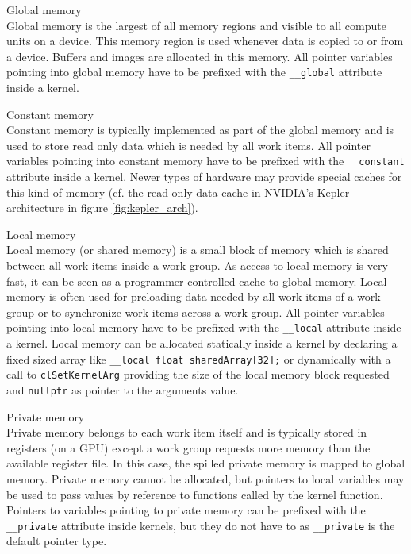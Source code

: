 \begin{numbereddescription}
	\item[Global memory] \hfill \\
	Global memory is the largest of all memory regions and visible to all compute units on a device. This memory region is used whenever data is copied to or from a device. Buffers and images are allocated in this memory. All pointer variables pointing into global memory have to be prefixed with the \lstinline!__global! attribute inside a kernel. \cite[p.29]{opencl_book}
	
	\item[Constant memory] \hfill \\
	Constant memory is typically implemented as part of the global memory and is used to store read only data which is needed by all work items. All pointer variables pointing into constant memory have to be prefixed with the \lstinline!__constant! attribute inside a kernel. \cite[p.30]{opencl_book} Newer types of hardware may provide special caches for this kind of memory (cf. the read-only data cache in NVIDIA's Kepler architecture in figure \ref{fig:kepler_arch}).
	
	\item[Local memory] \hfill \\
	Local memory (or shared memory) is a small block of memory which is shared between all work items inside a work group. As access to local memory is very fast, it can be seen as a programmer controlled cache to global memory. Local memory is often used for preloading data needed by all work items of a work group or to synchronize work items across a work group. All pointer variables pointing into local memory have to be prefixed with the \lstinline!__local! attribute inside a kernel. Local memory can be allocated statically inside a kernel by declaring a fixed sized array like \lstinline!__local float sharedArray[32];! or dynamically with a call to \lstinline!clSetKernelArg! providing the size of the local memory block requested and \lstinline!nullptr! as pointer to the arguments value. \cite[p.30]{opencl_book}

	\item[Private memory] \hfill \\
	Private memory belongs to each work item itself and is typically stored in registers (on a GPU) except a work group requests more memory than the available register file. In this case, the spilled private memory is mapped to global memory. Private memory cannot be allocated, but pointers to local variables may be used to pass values by reference to functions called by the kernel function. Pointers to variables pointing to private memory can be prefixed with the \lstinline!__private! attribute inside kernels, but they do not have to as \lstinline!__private! is the default pointer type. \cite[p.30]{opencl_book}
\end{numbereddescription}

